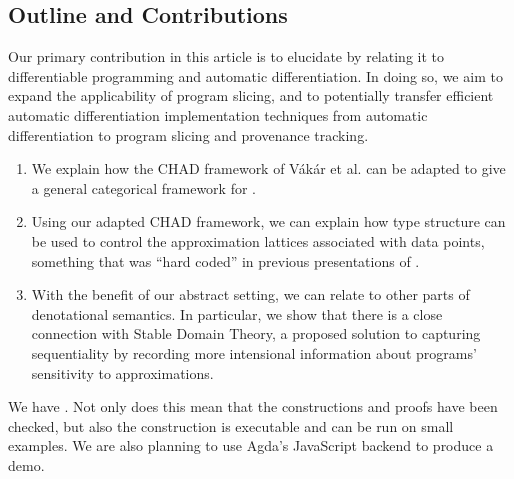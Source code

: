 \subsection{Outline and Contributions}

Our primary contribution in this article is to elucidate \GPS by relating it to differentiable programming and automatic differentiation. In doing so, we aim to expand the applicability of program slicing, and to potentially transfer efficient automatic differentiation implementation techniques from automatic differentiation to program slicing and provenance tracking.


\begin{enumerate}
\item We explain how the CHAD framework of Vákár et al. can be adapted to give a general categorical framework for \GPS.
\item Using our adapted CHAD framework, we can explain how type structure can be used to control the approximation lattices associated with data points, something that was ``hard coded'' in previous presentations of \GPS.
\item With the benefit of our abstract setting, we can relate \GPS to other parts of denotational semantics. In particular, we show that there is a close connection with Stable Domain Theory, a proposed solution to capturing sequentiality by recording more intensional information about programs' sensitivity to approximations.
\end{enumerate}

We have . Not only does this mean that the constructions and proofs have been checked, but also the construction is executable and can be run on small examples. We are also planning to use Agda's JavaScript backend to produce a demo.
